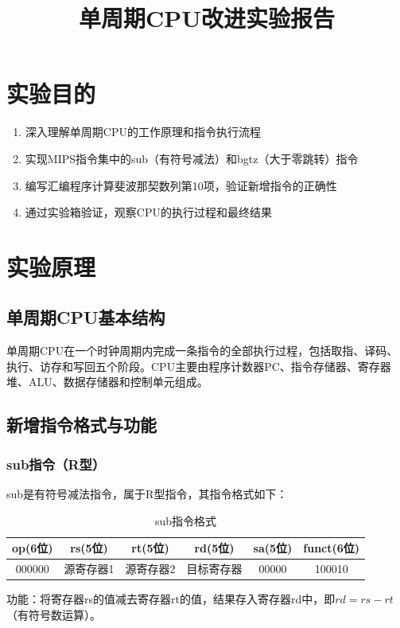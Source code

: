 \documentclass[12pt,a4paper]{article}
\title{单周期CPU改进实验报告}
\begin{document}
\maketitle



\section{实验目的}
\begin{enumerate}
    \item 深入理解单周期CPU的工作原理和指令执行流程
    \item 实现MIPS指令集中的sub（有符号减法）和bgtz（大于零跳转）指令
    \item 编写汇编程序计算斐波那契数列第10项，验证新增指令的正确性
    \item 通过实验箱验证，观察CPU的执行过程和最终结果
\end{enumerate}

\section{实验原理}
\subsection{单周期CPU基本结构}
单周期CPU在一个时钟周期内完成一条指令的全部执行过程，包括取指、译码、执行、访存和写回五个阶段。CPU主要由程序计数器PC、指令存储器、寄存器堆、ALU、数据存储器和控制单元组成。

\subsection{新增指令格式与功能}
\subsubsection{sub指令（R型）}
sub是有符号减法指令，属于R型指令，其指令格式如下：
\begin{table}[H]
\centering
\begin{tabular}{|c|c|c|c|c|c|}
\hline
op(6位) & rs(5位) & rt(5位) & rd(5位) & sa(5位) & funct(6位) \\
\hline
000000 & 源寄存器1 & 源寄存器2 & 目标寄存器 & 00000 & 100010 \\
\hline
\end{tabular}
\caption{sub指令格式}
\end{table}
功能：将寄存器rs的值减去寄存器rt的值，结果存入寄存器rd中，即$rd = rs - rt$（有符号数运算）。
\end{document}
